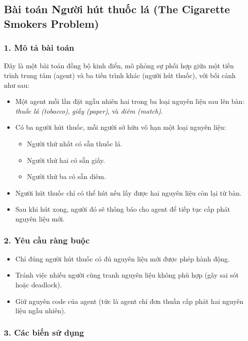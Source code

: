 \newpage
\subsection{Bài toán Người hút thuốc lá (The Cigarette Smokers Problem)}

\subsubsection*{1. Mô tả bài toán}

Đây là một bài toán đồng bộ kinh điển, mô phỏng sự phối hợp giữa một tiến trình trung tâm (agent) và ba tiến trình khác (người hút thuốc), với bối cảnh như sau:

\begin{itemize}
\item Một agent mỗi lần đặt ngẫu nhiên hai trong ba loại nguyên liệu sau lên bàn: \textit{thuốc lá (tobacco)}, \textit{giấy (paper)}, và \textit{diêm (match)}.
\item Có ba người hút thuốc, mỗi người sở hữu vô hạn một loại nguyên liệu:
\begin{itemize}
\item Người thứ nhất có sẵn thuốc lá.
\item Người thứ hai có sẵn giấy.
\item Người thứ ba có sẵn diêm.
\end{itemize}
\item Người hút thuốc chỉ có thể hút nếu lấy được hai nguyên liệu còn lại từ bàn.
\item Sau khi hút xong, người đó sẽ thông báo cho agent để tiếp tục cấp phát nguyên liệu mới.
\end{itemize}

\subsubsection*{2. Yêu cầu ràng buộc}
\begin{itemize}
\item Chỉ đúng người hút thuốc có đủ nguyên liệu mới được phép hành động.
\item Tránh việc nhiều người cùng tranh nguyên liệu không phù hợp (gây sai sót hoặc deadlock).
\item Giữ nguyên code của agent (tức là agent chỉ đơn thuần cấp phát hai nguyên liệu ngẫu nhiên).
\end{itemize}

\subsubsection*{3. Các biến sử dụng}

